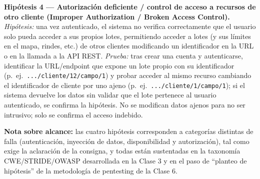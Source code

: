 \textbf{Hipótesis 4 --- Autorización deficiente / control de acceso a recursos de otro
cliente (Improper Authorization / Broken Access Control).}
\emph{Hipótesis:} una vez autenticado, el sistema no verifica correctamente que el usuario
solo pueda acceder a sus propios lotes, permitiendo acceder a lotes (y sus límites en el
mapa, rindes, etc.) de otros clientes modificando un identificador en la URL o en la
llamada a la API REST.
\emph{Prueba:} tras crear una cuenta y autenticarse, identificar la URL/endpoint que expone
un lote propio con su identificador (p.\ ej.\ \texttt{.../cliente/12/campo/1}) y probar
acceder al mismo recurso cambiando el identificador de cliente por uno ajeno (p.\ ej.\
\texttt{.../cliente/1/campo/1}); si el sistema devuelve los datos sin validar que el lote
pertenece al usuario autenticado, se confirma la hipótesis. No se modifican datos ajenos
para no ser intrusivo; solo se confirma el acceso indebido.

\textbf{Nota sobre alcance:} las cuatro hipótesis corresponden a categorías distintas de
falla (autenticación, inyección de datos, disponibilidad y autorización), tal como exige la
aclaración de la consigna, y todas están sustentadas en la taxonomía CWE/STRIDE/OWASP
desarrollada en la Clase 3 y en el paso de ``planteo de hipótesis'' de la metodología de
pentesting de la Clase 6.
